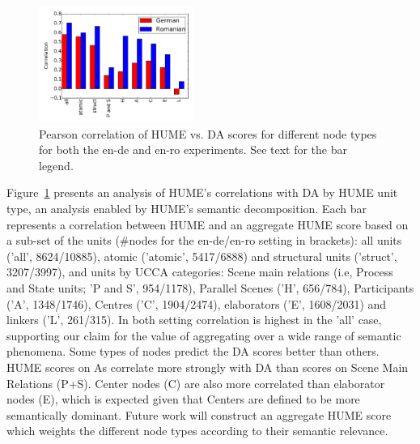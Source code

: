 \documentclass[11pt,letterpaper]{article}
\begin{document}
\begin{figure}[t]
\includegraphics[width=0.45\textwidth]{humevsDAcorrtypes-10en-dero.pdf}
\caption{Pearson correlation of HUME vs. DA scores for different node types for both
  the en-de and en-ro experiments. See text for the bar legend.
\label{fig:dacorrelationtypes}}
\end{figure}


Figure~\ref{fig:dacorrelationtypes} presents an analysis of HUME's correlations with DA by HUME unit type,
an analysis enabled by HUME's semantic decomposition. 
Each bar represents a correlation between HUME and an aggregate HUME score
based on a sub-set of the units (\#nodes for the en-de/en-ro setting in brackets):
all units ('all', 8624/10885), atomic ('atomic', 5417/6888) and structural units ('struct', 3207/3997),
and units by UCCA categories: Scene main relations (i.e, Process and State units; 'P and S', 954/1178), Parallel Scenes ('H', 656/784),
Participants ('A', 1348/1746),
Centres ('C', 1904/2474), elaborators ('E', 1608/2031) and linkers ('L', 261/315).
In both setting correlation is highest in the 'all' case, supporting our claim for the value of aggregating over a wide range of semantic phenomena. Some types of nodes predict the DA scores better than others. HUME scores on As correlate more strongly with DA than scores on Scene Main Relations (P+S). Center nodes (C) are also more correlated than elaborator nodes (E), which is expected given that Centers are defined to be more semantically dominant. Future work will construct an aggregate HUME score which weights the different node types according to their semantic relevance. 


\end{document}
